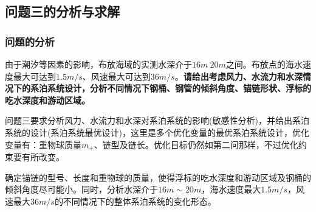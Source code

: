 \documentclass[UTF8]{ctexbook}
\theoremstyle{nonumberplain}
\begin{document}
    \subsection{问题三的分析与求解}
        \subsubsection{问题的分析}
            \par
            由于潮汐等因素的影响，布放海域的实测水深介于$16m~20m$之间。布放点的海水速度最大可达到$1.5m/s$、风速最大可达到$36m/s$。\textbf{请给出考虑风力、水流力和水深情况下的系泊系统设计，分析不同情况下钢桶、钢管的倾斜角度、锚链形状、浮标的吃水深度和游动区域。}
            \par
            问题三要求分析风力、水流力和水深对系泊系统的影响(敏感性分析)，并给出系泊系统的设计(系泊系统最优设计)，这里是多个优化变量的最优系泊系统设计，优化变量有：重物球质量$m_+$、链型及链长。优化目标仍然如第二问那样，不过优化约束要有所改变。
            \par
            确定锚链的型号、长度和重物球的质量，使得浮标的吃水深度和游动区域及钢桶的倾斜角度尽可能小。同时，分析水深介于$16m\sim 20m$，海水速度最大$1.5m/s$，风速最大$36m/s$的不同情况下的整体系泊系统的变化形态。
\end{document}
